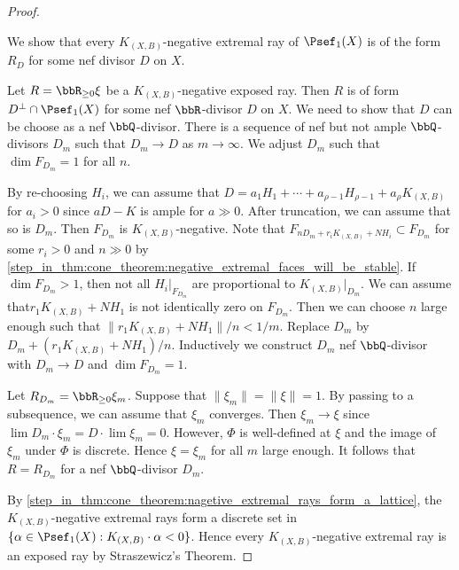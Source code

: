 \begin{proof}
        \begin{step}\label{step_in_thm:cone_theorem:negative_extremal_rays_are_rational}
            We show that every \(K_{(X,B)}\)-negative extremal ray of \(\Psef_1(X)\) is of the form \(R_D\) for some nef divisor \(D\) on \(X\).
        \end{step}
        Let \(R = \bbR_{\geq 0}\xi\) be a \(K_{(X,B)}\)-negative exposed ray.
        Then \(R\) is of form \(D^\perp \cap \Psef_1(X)\) for some nef \(\bbR\)-divisor \(D\) on \(X\).
        We need to show that \(D\) can be choose as a nef \(\bbQ\)-divisor.
        There is a sequence of nef but not ample \(\bbQ\)-divisors \(D_m\) such that \(D_m \to D\) as \(m \to \infty\).
        We adjust \(D_m\) such that \(\dim F_{D_m} = 1\) for all \(n\).

        By re-choosing \(H_i\), we can assume that \(D = a_1H_1 + \cdots + a_{\rho-1}H_{\rho-1} + a_\rho K_{(X,B)}\) for \(a_i > 0\) since \(aD-K\) is ample for \(a \gg 0\).
        After truncation, we can assume that so is \(D_m\).
        Then \(F_{D_m}\) is \(K_{(X,B)}\)-negative.
        Note that \(F_{nD_m+r_iK_{(X,B)} + N H_i} \subset F_{D_m}\) for some \(r_i>0\) and \(n\gg 0\) by \cref{step_in_thm:cone_theorem:negative_extremal_faces_will_be_stable}.
        If \(\dim F_{D_m} > 1\), then not all \(H_i|_{F_{D_m}}\) are proportional to \(K_{(X,B)}|_{D_m}\).
        We can assume that\(r_1K_{(X,B)}+N H_1\) is not identically zero on \(F_{D_m}\).
        Then we can choose \(n\) large enough such that \(\|r_1K_{(X,B)}+N H_1\|/n < 1/m\).
        Replace \(D_m\) by \(D_m + (r_1K_{(X,B)}+N H_1)/n\).
        Inductively we construct \(D_m\) nef \(\bbQ\)-divisor with \(D_m \to D\) and \(\dim F_{D_m} = 1\).
        
        Let \(R_{D_m} = \bbR_{\geq 0} \xi_m\).
        Suppose that \(\|\xi_m\|=\|\xi\| = 1\).
        By passing to a subsequence, we can assume that \(\xi_m\) converges.
        Then \(\xi_m \to \xi\) since \(\lim D_m \cdot \xi_m = D \cdot \lim \xi_m = 0\).
        However, \(\Phi\) is well-defined at \(\xi\) and the image of \(\xi_m\) under \(\Phi\) is discrete.
        Hence \(\xi=\xi_m\) for all \(m\) large enough.
        It follows that \(R = R_{D_m}\) for a nef \(\bbQ\)-divisor \(D_m\).

        By \cref{step_in_thm:cone_theorem:nagetive_extremal_rays_form_a_lattice}, the \(K_{(X,B)}\)-negative extremal rays form a discrete set in \(\{\alpha \in \Psef_1(X): K_{(X,B)}\cdot \alpha < 0\}\).
        Hence every \(K_{(X,B)}\)-negative extremal ray is an exposed ray by Straszewicz's Theorem.


\end{proof}
